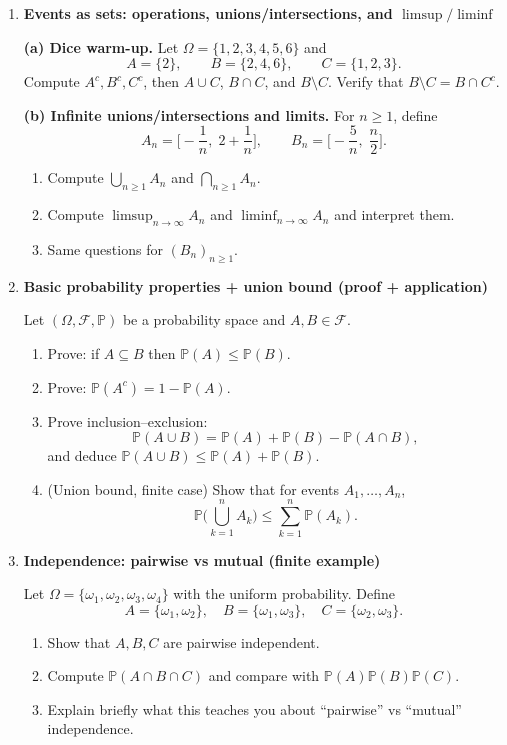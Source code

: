 \documentclass[11pt]{article}
\begin{document}
\begin{enumerate}[leftmargin=*, itemsep=1.2em]

\item \textbf{Events as sets: operations, unions/intersections, and $\limsup/\liminf$}

\textbf{(a) Dice warm-up.}
Let $\Omega=\{1,2,3,4,5,6\}$ and
\[
A=\{2\},\qquad B=\{2,4,6\},\qquad C=\{1,2,3\}.
\]
Compute $A^c,B^c,C^c$, then $A\cup C$, $B\cap C$, and $B\setminus C$.
Verify that $B\setminus C=B\cap C^c$.

\medskip
\textbf{(b) Infinite unions/intersections and limits.}
For $n\ge1$, define
\[
A_n=\Big[-\frac1n,\;2+\frac1n\Big],
\qquad
B_n=\Big[-\frac5n,\;\frac{n}{2}\Big].
\]
\begin{enumerate}[label=(\roman*)]
\item Compute $\bigcup_{n\ge1}A_n$ and $\bigcap_{n\ge1}A_n$.
\item Compute $\limsup_{n\to\infty}A_n$ and $\liminf_{n\to\infty}A_n$ and interpret them.
\item Same questions for $(B_n)_{n\ge1}$.
\end{enumerate}

\bigskip

\item \textbf{Basic probability properties + union bound (proof + application)}

Let $(\Omega,\mathcal{F},\mathbb{P})$ be a probability space and $A,B\in\mathcal{F}$.
\begin{enumerate}[label=(\alph*)]
\item Prove: if $A\subseteq B$ then $\mathbb{P}(A)\le \mathbb{P}(B)$.
\item Prove: $\mathbb{P}(A^c)=1-\mathbb{P}(A)$.
\item Prove inclusion--exclusion:
\[
\mathbb{P}(A\cup B)=\mathbb{P}(A)+\mathbb{P}(B)-\mathbb{P}(A\cap B),
\]
and deduce $\mathbb{P}(A\cup B)\le \mathbb{P}(A)+\mathbb{P}(B)$.
\item (Union bound, finite case) Show that for events $A_1,\dots,A_n$,
\[
\mathbb{P}\Big(\bigcup_{k=1}^n A_k\Big)\le \sum_{k=1}^n \mathbb{P}(A_k).
\]
\end{enumerate}

\bigskip

\item \textbf{Independence: pairwise vs mutual (finite example)}

Let $\Omega=\{\omega_1,\omega_2,\omega_3,\omega_4\}$ with the uniform probability.
Define
\[
A=\{\omega_1,\omega_2\},\quad
B=\{\omega_1,\omega_3\},\quad
C=\{\omega_2,\omega_3\}.
\]
\begin{enumerate}[label=(\alph*)]
\item Show that $A,B,C$ are pairwise independent.
\item Compute $\mathbb{P}(A\cap B\cap C)$ and compare with $\mathbb{P}(A)\mathbb{P}(B)\mathbb{P}(C)$.
\item Explain briefly what this teaches you about ``pairwise'' vs ``mutual'' independence.
\end{enumerate}


\end{enumerate}
\end{document}
